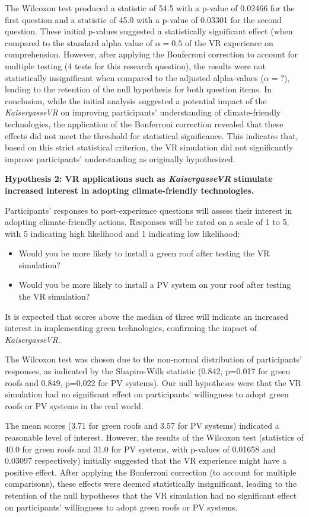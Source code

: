 \documentclass[draft, final]{vutinfth} %
\begin{document}
The Wilcoxon test produced a statistic of 54.5 with a p-value of 0.02466 for the first question and a statistic of 45.0 with a p-value of 0.03301 for the second question. These initial p-values suggested a statistically significant effect (when compared to the standard alpha value of $\alpha = 0.5$ of the VR experience on comprehension. However, after applying the Bonferroni correction to account for multiple testing (4 tests for this research question), the results were not statistically insignificant when compared to the adjusted alpha-values ($\alpha = ?$), leading to the retention of the null hypothesis for both question items.
In conclusion, while the initial analysis suggested a potential impact of the \textit{KaisergasseVR} on improving participants' understanding of climate-friendly technologies, the application of the Bonferroni correction revealed that these effects did not meet the threshold for statistical significance. This indicates that, based on this strict statistical criterion, the VR simulation did not significantly improve participants' understanding as originally hypothesized.

\textbf{Hypothesis 2: VR applications such as \textit{KaisergasseVR} stimulate increased interest in adopting climate-friendly technologies.} 

Participants' responses to post-experience questions will assess their interest in adopting climate-friendly actions. Responses will be rated on a scale of 1 to 5, with 5 indicating high likelihood and 1 indicating low likelihood:
\begin{itemize}
    \item Would you be more likely to install a green roof after testing the VR simulation?
    \item Would you be more likely to install a PV system on your roof after testing the VR simulation?
\end{itemize}
It is expected that scores above the median of three will indicate an increased interest in implementing green technologies, confirming the impact of \textit{KaisergasseVR}.

The Wilcoxon test was chosen due to the non-normal distribution of participants' responses, as indicated by the Shapiro-Wilk statistic (0.842, p=0.017 for green roofs and 0.849, p=0.022 for PV systems). Our null hypotheses were that the VR simulation had no significant effect on participants' willingness to adopt green roofs or PV systems in the real world.

The mean scores (3.71 for green roofs and 3.57 for PV systems) indicated a reasonable level of interest. However, the results of the Wilcoxon test (statistics of 40.0 for green roofs and 31.0 for PV systems, with p-values of 0.01658 and 0.03097 respectively) initially suggested that the VR experience might have a positive effect. After applying the Bonferroni correction (to account for multiple comparisons), these effects were deemed statistically insignificant, leading to the retention of the null hypotheses that the VR simulation had no significant effect on participants' willingness to adopt green roofs or PV systems.
\end{document}
